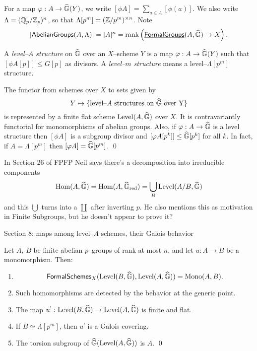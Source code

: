 For a map $\varphi: A \to \widehat{\mathbb G}(Y)$, we write $[\phi A] = \sum_{a \in A}[\phi(a)]$.  We also write $\Lambda = (\mathbb{Q}_p / \mathbb Z_p)^n$, so that $\Lambda[p^m] = (\mathbb Z/p^m)^{\times n}$.  Note \[|\mathsf{AbelianGroups}(A, \Lambda)| = |A|^n = \operatorname{rank} \left( \operatorname{\underline{\smash{\mathsf{FormalGroups}}}}(A, \widehat{\mathbb G}) \to X \right).\]

\begin{definition}
A \textit{level--$A$ structure} on $\widehat{\mathbb G}$ over an $X$--scheme $Y$ is a map $\varphi: A \to \widehat{\mathbb G}(Y)$ such that $[\phi A[p]] \le G[p]$ as divisors.  A \textit{level--$m$ structure} means a level--$\Lambda[p^m]$ structure.
\end{definition}

\begin{lemma}
The functor from schemes over $X$ to sets given by \[Y \mapsto \{\text{level--$A$ structures on $\widehat{\mathbb G}$ over Y}\}\] is represented by a finite flat scheme $\operatorname{Level}(A, \widehat{\mathbb G})$ over $X$.  It is contravariantly functorial for monomorphisms of abelian groups.  Also, if $\varphi: A \to \widehat{\mathbb G}$ is a level structure then $[\phi A]$ is a subgroup divisor and $[\varphi A[p^k]] \le \widehat{\mathbb G}[p^k]$ for all $k$.  In fact, if $A = \Lambda[p^m]$ then $[\varphi A] = \widehat{\mathbb G}[p^m]$.  \qed  {}
\end{lemma}

In Section 26 of FPFP Neil says there's a decomposition into irreducible components \[\operatorname{Hom}(A, \widehat{\mathbb G}) = \operatorname{Hom}(A, \widehat{\mathbb G}_{\mathrm{red}}) = \bigcup_B \operatorname{Level}(A/B, \widehat{\mathbb G})\] and this $\bigcup$ turns into a $\coprod$ after inverting $p$.  He also mentions this as motivation in Finite Subgroups, but he doesn't appear to prove it?

Section 8: maps among level--$A$ schemes, their Galois behavior

\begin{theorem}
Let $A$, $B$ be finite abelian $p$--groups of rank at most $n$, and let $u: A \to B$ be a monomorphism. Then:
\begin{enumerate}
\item \[\mathsf{FormalSchemes}_X(\operatorname{Level}(B, \widehat{\mathbb G}), \operatorname{Level}(A, \widehat{\mathbb G})) = \operatorname{Mono}(A, B).\]
\item Such homomorphisms are detected by the behavior at the generic point.
\item The map $u^!: \operatorname{Level}(B, \widehat{\mathbb G}) \to \operatorname{Level}(A, \widehat{\mathbb G})$ is finite and flat.
\item If $B \simeq \Lambda[p^m]$, then $u^!$ is a Galois covering.
\item The torsion subgroup of $\widehat{\mathbb G}(\operatorname{Level}(A, \widehat{\mathbb G}))$ is $A$. \qed
\end{enumerate}
\end{theorem}

